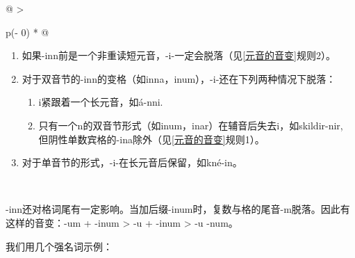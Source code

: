 \begin{longtable}[]{@{}
  >{\raggedright\arraybackslash}p{(\columnwidth - 0\tabcolsep) * }@{}}
\toprule\noalign{}
\begin{minipage}[b]{\linewidth}\raggedright
\begin{enumerate}
\def\labelenumi{\arabic{enumi})}
\item
  如果-inn前是一个非重读短元音，-i-一定会脱落（见\ref{元音的音变}规则2）。
\item
  对于双音节的-inn的变格（如inna，inum），-i-还在下列两种情况下脱落：

  \begin{enumerate}
  \def\labelenumii{\roman{enumii}.}
  \item
    i紧跟着一个长元音，如á-nni.
  \item
    只有一个n的双音节形式（如inum，inar）在辅音后失去i，如skildir-nir,
    但阴性单数宾格的-ina除外（见\ref{元音的音变}规则1）。
  \end{enumerate}
\item
  对于单音节的形式，-i-在长元音后保留，如kné-in。
\end{enumerate}
\end{minipage} \\
\midrule\noalign{}
\endhead
\bottomrule\noalign{}
\endlastfoot
\end{longtable}

-inn还对格词尾有一定影响。当加后缀-inum时，复数与格的尾音-m脱落。因此有这样的音变：-um
+ -inum \textgreater{} -u + -inum \textgreater{} -u -num。

我们用几个强名词示例：

